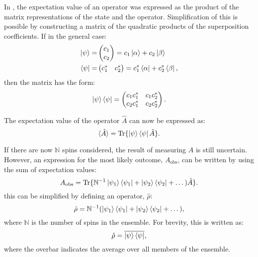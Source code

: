 In , the expectation value of an operator was expressed as
the product of the matrix representations of the state and the operator. Simplification of this
is possible by constructing a matrix of the quadratic products of the superposition coefficients. If in the
general case:
\begin{align}
\ket{\psi} =& \begin{pmatrix}
    c_1\\
    c_2
\end{pmatrix} = c_1\ket{\alpha} + c_2\ket{\beta}\\
\bra{\psi} =& \begin{pmatrix}
  c_1^* & c_2^*
\end{pmatrix} = c_1^*\bra{\alpha} + c_2^*\bra{\beta},
\end{align}
then the matrix has the form:
\begin{equation}
\ket{\psi}\bra{\psi} = \begin{pmatrix}
    {c_1c_1^*} & {c_1c_2^*}\\
    {c_2c_1^*} & {c_2c_2^*}
\end{pmatrix}.
\end{equation}

The expectation value of the operator $\hat{A}$ can now be expressed as:
\begin{equation}
  \langle\hat{A}\rangle = \text{Tr}\{\ket{\psi}\bra{\psi}\hat{A}\}.
\end{equation}

If there are now $\mathbb{N}$ spins considered, the
result of measuring $A$ is still uncertain. However, an expression for the most likely outcome,
$A_{\text{obs}}$, can be written by using the sum of expectation values:
\begin{equation}
  A_{\text{obs}} = \text{Tr}\{\mathbb{N}^{-1}\ket{\psi_1}\bra{\psi_1}+\ket{\psi_2}\bra{\psi_2}+\dots)\hat{A}\}.
\end{equation}
this can be simplified by defining an operator, $\hat{\rho}$:
\begin{equation}
  \hat{\rho} = \mathbb{N}^{-1}(\ket{\psi_1}\bra{\psi_1}+\ket{\psi_2}\bra{\psi_2}+\dots),
\end{equation}
where $\mathbb{N}$ is the number of spins in the ensemble. For brevity,
this is written as:
\begin{equation}
  \hat{\rho} = \overline{\ket{\psi}\bra{\psi}},
\end{equation}
where the overbar indicates the average over all members of the ensemble.

